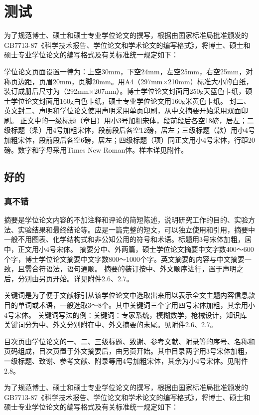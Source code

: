 \setcounter{page}{1}
\chapter{测试}{
	为了规范博士、硕士和硕士专业学位论文的撰写，根据由国家标准局批准颁发的GB7713-87《科学技术报告、学位论文和学术论文的编写格式》，将博士、硕士和硕士专业学位论文的编写格式及有关标准统一规定如下：
	
	学位论文页面设置一律为：上空30mm，下空24mm，左空25mm，右空25mm，对称页边距，页眉20mm，页脚20mm。用A4（297mm×210mm）标准大小的白纸，装订成册后尺寸为（292mm×207mm）。博士学位论文封面用250g天蓝色卡纸，硕士学位论文封面用160g白色卡纸，硕士专业学位论文用160g米黄色卡纸。
	封二、英文封二、声明和学位论文使用声明采用单页印刷，从中文摘要开始采用双面印刷。
	正文中的一级标题（章目）用小3号加粗宋体，段前段后各空18磅，居左；二级标题（条）用4号加粗宋体，段前段后各空12磅，居左；三级标题（款）用小4号加粗宋体，段前段后各空6磅，居左；四级标题（项）同正文用小4号宋体，行距20磅。数字和字母采用Times New Roman体。样本详见附件。
	\section{好的}
	\subsection{真不错}
	摘要是学位论文内容的不加注释和评论的简短陈述，说明研究工作的目的、实验方法、实验结果和最终结论等。应是一篇完整的短文，可以独立使用和引用，摘要中一般不用图表、化学结构式和非公知公用的符号和术语。标题用3号宋体加粗，居中，正文用小4号宋体。
	摘要分中、外两篇，硕士学位论文摘要中文字数400～600个字，博士学位论文摘要中文字数800～1000个字。英文摘要的内容与中文摘要一致，且需合符语法，语句通顺。
	摘要的装订按中、外文顺序进行，置于声明之后，分别由另页开始。详见附件2.6、2.7。
	
	关键词是为了便于文献标引从该学位论文中选取出来用以表示全文主题内容信息款目的单词或术语，一般选取3～8个。其中关键词三个字用四号宋体加粗，其余用小4号宋体。
	关键词写法的例：关键词：专家系统，模糊数学，枪械设计，知识库
	关键词分为中、外文分别附在中、外文摘要的末尾。见附件2.6、2.7。
	
	目次页由学位论文的一、二、三级标题、致谢、参考文献、附录等的序号、名称和页码组成，目次页置于外文摘要后，由另页开始。其中目录两字用3号宋体加粗，一级标题、致谢、参考文献、附录等用4号加粗宋体，其余为小4号宋体。见附件2.8。
	
	为了规范博士、硕士和硕士专业学位论文的撰写，根据由国家标准局批准颁发的GB7713-87《科学技术报告、学位论文和学术论文的编写格式》，将博士、硕士和硕士专业学位论文的编写格式及有关标准统一规定如下：
	
}
